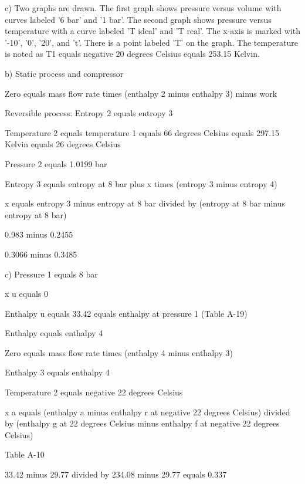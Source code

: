 c)
Two graphs are drawn. The first graph shows pressure versus volume with curves labeled '6 bar' and '1 bar'. The second graph shows pressure versus temperature with a curve labeled 'T ideal' and 'T real'. The x-axis is marked with '-10', '0', '20', and 't'. There is a point labeled 'T' on the graph. The temperature is noted as T1 equals negative 20 degrees Celsius equals 253.15 Kelvin.

b)
Static process and compressor

Zero equals mass flow rate times (enthalpy 2 minus enthalpy 3) minus work

Reversible process:
Entropy 2 equals entropy 3

Temperature 2 equals temperature 1 equals 66 degrees Celsius equals 297.15 Kelvin equals 26 degrees Celsius

Pressure 2 equals 1.0199 bar

Entropy 3 equals entropy at 8 bar plus x times (entropy 3 minus entropy 4)

x equals entropy 3 minus entropy at 8 bar divided by (entropy at 8 bar minus entropy at 8 bar)

0.983 minus 0.2455

0.3066 minus 0.3485

c)
Pressure 1 equals 8 bar

x u equals 0

Enthalpy u equals 33.42 equals enthalpy at pressure 1 (Table A-19)

Enthalpy equals enthalpy 4

Zero equals mass flow rate times (enthalpy 4 minus enthalpy 3)

Enthalpy 3 equals enthalpy 4

Temperature 2 equals negative 22 degrees Celsius

x a equals (enthalpy a minus enthalpy r at negative 22 degrees Celsius) divided by (enthalpy g at 22 degrees Celsius minus enthalpy f at negative 22 degrees Celsius)

Table A-10

33.42 minus 29.77 divided by 234.08 minus 29.77 equals 0.337